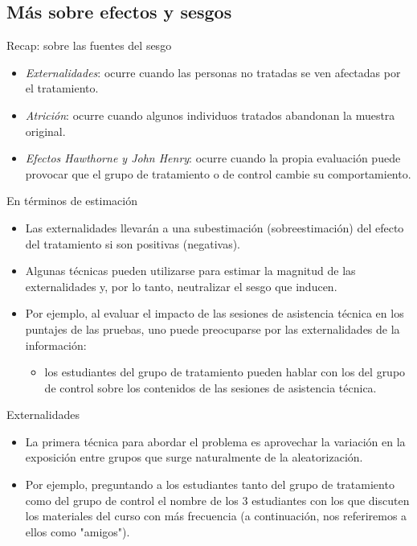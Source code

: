 \documentclass[11pt, aspectratio=169, compress]{beamer}
\begin{document}
\subsection{Más sobre efectos y sesgos}
\begin{frame}{Recap: sobre las fuentes del sesgo}
	\begin{itemize}
		\item \textit{Externalidades}: ocurre cuando las personas no tratadas se ven afectadas por el tratamiento.
		\item \textit{Atrición}: ocurre cuando algunos individuos tratados abandonan la muestra original.
		\item \textit{Efectos Hawthorne y John Henry}: ocurre cuando la propia evaluación puede provocar que el grupo de tratamiento o de control cambie su comportamiento.
	\end{itemize}
\end{frame}
\begin{frame}{En términos de estimación}
	\begin{itemize}
		\item Las externalidades llevarán a una subestimación (sobreestimación) del efecto del tratamiento si son positivas (negativas).
		\item Algunas técnicas pueden utilizarse para estimar la magnitud de las externalidades y, por lo tanto, neutralizar el sesgo que inducen.
		\item Por ejemplo, al evaluar el impacto de las sesiones de asistencia técnica en los puntajes de las pruebas, uno puede preocuparse por las externalidades de la información: 
		\begin{itemize}
			\item los estudiantes del grupo de tratamiento pueden hablar con los del grupo de control sobre los contenidos de las sesiones de asistencia técnica.
		\end{itemize}
	\end{itemize}
\end{frame}
\begin{frame}{Externalidades}
	\begin{itemize}
		\item La primera técnica para abordar el problema es aprovechar la variación en la exposición entre grupos que surge naturalmente de la aleatorización.
		\item Por ejemplo, preguntando a los estudiantes tanto del grupo de tratamiento como del grupo de control el nombre de los 3 estudiantes con los que discuten los materiales del curso con más frecuencia (a continuación, nos referiremos a ellos como "amigos").
	\end{itemize}
\end{frame}
\end{document}
